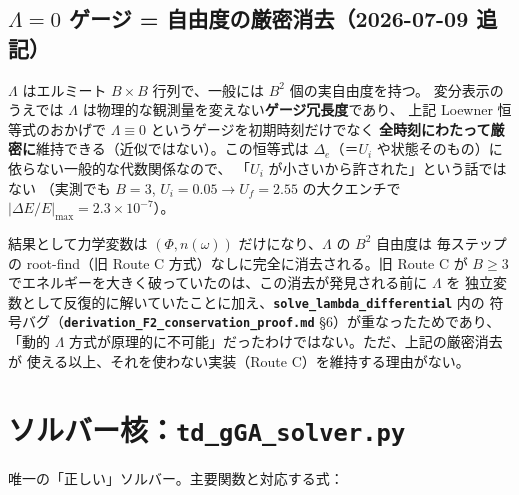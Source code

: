 \documentclass[11pt]{ltjsarticle}
\newcommand{\file}[1]{\textbf{\texttt{#1}}}
\begin{document}
\subsection*{$\Lambda=0$ ゲージ = 自由度の厳密消去（2026-07-09 追記）}

$\Lambda$ はエルミート $B\times B$ 行列で、一般には $B^2$ 個の実自由度を持つ。
変分表示のうえでは $\Lambda$ は物理的な観測量を変えない\textbf{ゲージ冗長度}であり、
上記 Loewner 恒等式のおかげで $\Lambda\equiv 0$ というゲージを初期時刻だけでなく
\textbf{全時刻にわたって厳密に}維持できる（近似ではない）。この恒等式は
$\Delta_e$（＝$U_i$ や状態そのもの）に依らない一般的な代数関係なので、
「$U_i$ が小さいから許された」という話ではない
（実測でも $B=3$, $U_i=0.05\to U_f=2.55$ の大クエンチで $|\Delta E/E|_{\max}=2.3\times10^{-7}$）。

結果として力学変数は $(\Phi, n(\omega))$ だけになり、$\Lambda$ の $B^2$ 自由度は
毎ステップの root-find（旧 Route C 方式）なしに完全に消去される。旧 Route C が
$B\ge3$ でエネルギーを大きく破っていたのは、この消去が発見される前に $\Lambda$ を
独立変数として反復的に解いていたことに加え、\file{solve\_lambda\_differential} 内の
符号バグ（\file{derivation\_F2\_conservation\_proof.md} \S6）が重なったためであり、
「動的 $\Lambda$ 方式が原理的に不可能」だったわけではない。ただ、上記の厳密消去が
使える以上、それを使わない実装（Route C）を維持する理由がない。

\section{ソルバー核：\file{td\_gGA\_solver.py}}

唯一の「正しい」ソルバー。主要関数と対応する式：
\end{document}
